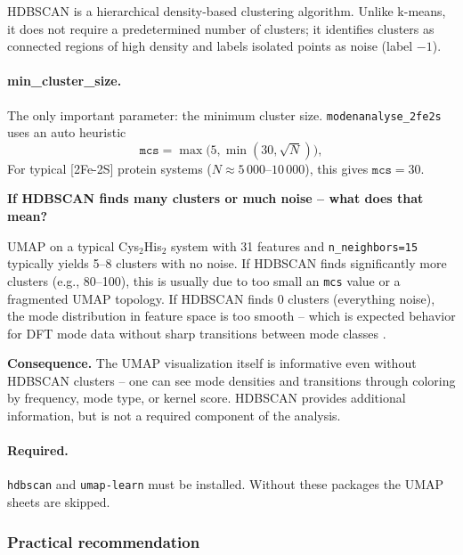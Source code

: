 \documentclass[11pt,a4paper,twoside]{article}
\theoremstyle{remark}
\begin{document}
HDBSCAN \cite{Campello2013,McInnes2017} is a hierarchical
density-based clustering algorithm. Unlike k-means, it does not
require a predetermined number of clusters; it identifies clusters
as connected regions of high density and labels isolated points as
noise (label $-1$).

\paragraph{min\_cluster\_size.} The only important parameter:
the minimum cluster size. \texttt{modenanalyse\_2fe2s} uses an
auto heuristic
\[
  \texttt{mcs} = \max\bigl(5, \min(30, \sqrt{N})\bigr),
\]
For typical [2Fe-2S] protein systems
($N \approx 5\,000$--$10\,000$), this gives $\texttt{mcs} = 30$.

\begin{infobox}
\textbf{If HDBSCAN finds many clusters or much noise --
what does that mean?}

UMAP on a typical Cys$_2$His$_2$ system with 31 features and
\texttt{n\_neighbors=15} typically yields 5--8 clusters with no
noise. If HDBSCAN finds significantly more clusters (e.g., 80--100),
this is usually due to too small an \texttt{mcs} value or a
fragmented UMAP topology. If HDBSCAN finds 0 clusters (everything
noise), the mode distribution in feature space is too smooth --
which is expected behavior for DFT mode data without sharp
transitions between mode classes \cite{Campello2013}.

\textbf{Consequence.} The UMAP visualization itself is informative
even without HDBSCAN clusters -- one can see mode densities and
transitions through coloring by frequency, mode type, or kernel
score. HDBSCAN provides additional information, but is not a
required component of the analysis.
\end{infobox}

\paragraph{Required.} \texttt{hdbscan} and \texttt{umap-learn} must
be installed. Without these packages the UMAP sheets are skipped.

\subsubsection*{Practical recommendation}
\end{document}
